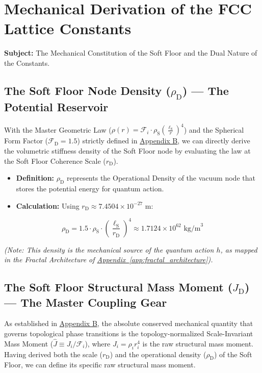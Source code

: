 \chapter{Mechanical Derivation of the FCC Lattice Constants}
\label{app:fcc_constants}

\noindent\textbf{Subject:} The Mechanical Constitution of the Soft Floor and the Dual Nature of the Constants.

\section{The Soft Floor Node Density ($\rho_{\mathrm{D}}$) --- The Potential Reservoir}
With the Master Geometric Law ($\rho(r) = \mathcal{F}_i \cdot \rho_{\mathrm{S}} \left(\frac{\ell_{\mathrm{S}}}{r}\right)^4$) and the Spherical Form Factor ($\mathcal{F}_{\mathrm{D}} = 1.5$) strictly defined in \hyperref[app:conservation_action]{Appendix B}, we can directly derive the volumetric stiffness density of the Soft Floor node by evaluating the law at the Soft Floor Coherence Scale ($r_{\mathrm{D}}$).

\begin{itemize}
    \item \textbf{Definition:} $\rho_{\mathrm{D}}$ represents the Operational Density of the vacuum node that stores the potential energy for quantum action.
    \item \textbf{Calculation:} Using $r_{\mathrm{D}} \approx 7.4504 \times 10^{-27}$ m:
\end{itemize}
\begin{equation}
    \rho_{\mathrm{D}} = 1.5 \cdot \rho_{\mathrm{S}} \cdot \left(\frac{\ell_{\mathrm{S}}}{r_{\mathrm{D}}}\right)^4 \approx 1.7124 \times 10^{62} \text{ kg/m}^3
\end{equation}

\textit{(Note: This density is the mechanical source of the quantum action $h$, as mapped in the Fractal Architecture of \hyperref[app:fractal_architecture]{Appendix~\ref*{app:fractal_architecture}}).}

\section{The Soft Floor Structural Mass Moment ($J_{\mathrm{D}}$) --- The Master Coupling Gear}
As established in \hyperref[app:conservation_action]{Appendix B}, the absolute conserved mechanical quantity that governs topological phase transitions is the topology-normalized Scale-Invariant Mass Moment ($\hat{J} \equiv J_i / \mathcal{F}_i$), where $J_i = \rho_i r_i^4$ is the raw structural mass moment. Having derived both the scale ($r_{\mathrm{D}}$) and the operational density ($\rho_{\mathrm{D}}$) of the Soft Floor, we can define its specific raw structural mass moment.

